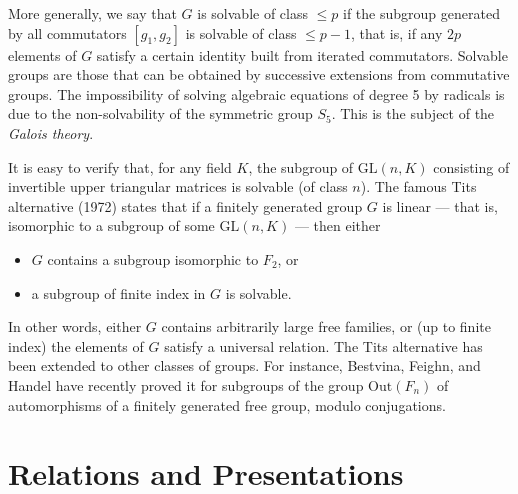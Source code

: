 \documentclass{amsart}
\begin{document}
More generally, we say that $G$ is solvable of class $\leq p$ if the
subgroup generated by all commutators $[g_1, g_2]$ is solvable of
class $\leq p - 1$, that is, if any $2p$ elements of $G$ satisfy a
certain identity built from iterated commutators. Solvable groups are
those that can be obtained by successive extensions from commutative
groups. The impossibility of solving algebraic equations of degree 5
by radicals is due to the non-solvability of the symmetric group $S_5$.
This is the subject of the \textit{Galois theory}.

It is easy to verify that, for any field $K$, the subgroup of
$\mathrm{GL}(n, K)$ consisting of invertible upper triangular matrices
is solvable (of class $n$). The famous Tits alternative (1972) states
that if a finitely generated group $G$ is linear --- that is, isomorphic
to a subgroup of some $\mathrm{GL}(n, K)$ --- then either
\begin{itemize}
\item $G$ contains a subgroup isomorphic to $F_2$, or
\item a subgroup of finite index in $G$ is solvable.
\end{itemize}
In other words, either $G$ contains arbitrarily large free families,
or (up to finite index) the elements of $G$ satisfy a universal
relation. The Tits alternative has been extended to other classes of
groups. For instance, Bestvina, Feighn, and Handel have recently
proved it for subgroups of the group $\mathrm{Out}(F_n)$ of
automorphisms of a finitely generated free group, modulo conjugations.


\section{Relations and Presentations}
\end{document}
